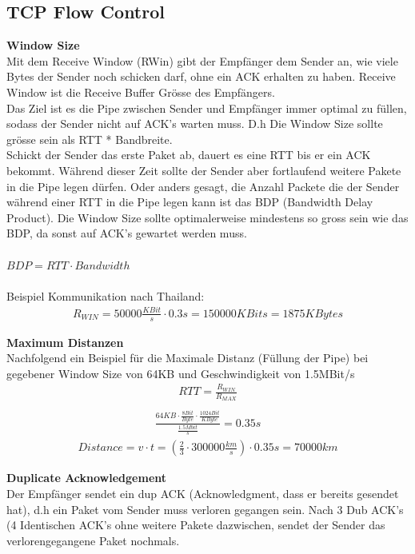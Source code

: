 \subsection{TCP Flow Control}
\textbf{Window Size}\\
Mit dem Receive Window (RWin) gibt der Empfänger dem Sender an, wie viele Bytes der Sender noch schicken darf, ohne ein ACK erhalten zu haben. Receive Window ist die Receive Buffer Grösse des Empfängers.\\
Das Ziel ist es die Pipe zwischen Sender und Empfänger immer optimal zu füllen, sodass der Sender nicht auf ACK's warten muss. D.h Die Window Size sollte grösse sein als RTT * Bandbreite.\\
Schickt der Sender das erste Paket ab, dauert es eine RTT bis er ein ACK bekommt. Während dieser Zeit sollte der Sender aber fortlaufend weitere Pakete in die Pipe legen dürfen. Oder anders gesagt, die Anzahl Packete die der Sender während einer RTT in die Pipe legen kann ist das BDP (Bandwidth Delay Product). Die Window Size sollte optimalerweise mindestens so gross sein wie das BDP, da sonst auf ACK's gewartet werden muss.\\\\
$BDP=RTT \cdot Bandwidth$\\\\
Beispiel Kommunikation nach Thailand:\\
\begin{align*}
R_{WIN} = 50000 \frac{KBit}{s} \cdot 0.3s = 150000 KBits = 1875 KBytes
\end{align*}

\textbf{Maximum Distanzen}\\
Nachfolgend ein Beispiel für die Maximale Distanz (Füllung der Pipe) bei gegebener Window Size von 64KB und Geschwindigkeit von 1.5MBit/s
\begin{align*}
RTT = \frac{R_{WIN}}{R_{MAX}}\\
\end{align*}
\begin{align*}
\frac{64KB \cdot \frac{8Bit}{Byte} \cdot \frac{1024Bit}{KByte}}{\frac{1.5Mbit}{s}} = 0.35s
\end{align*}
\begin{align*}
Distance = v \cdot t =(\frac{2}{3} \cdot 300000 \frac{km}{s})\cdot 0.35s = 70000km
\end{align*}

\textbf{Duplicate Acknowledgement}\\
Der Empfänger sendet ein dup ACK (Acknowledgment, dass er bereits gesendet hat), d.h ein Paket vom Sender muss verloren gegangen sein. Nach 3 Dub ACK's (4 Identischen ACK's ohne weitere Pakete dazwischen, sendet der Sender das verlorengegangene Paket nochmals.


